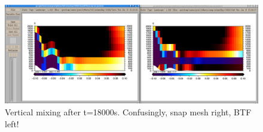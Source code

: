 \begin{figure}
\includegraphics[width=\textwidth]{interim-results/gravityWavesBTFsnapMidZoom18000.png}
\caption{Vertical mixing after t=18000s.  Confusingly, snap mesh right, BTF left!}
\label{fig:gw:mixing-18000s}
\end{figure}

